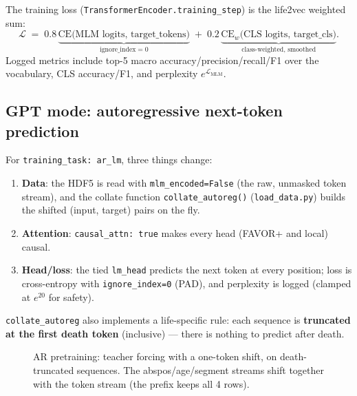 \documentclass[11pt,a4paper]{article}
\newcommand{\file}[1]{\texttt{\small #1}}
\newcommand{\code}[1]{\texttt{\small #1}}
\begin{document}
\noindent The training loss (\code{TransformerEncoder.training\_step}) is the
life2vec weighted sum:
\[
\mathcal{L} \;=\; 0.8\,\underbrace{\mathrm{CE}\big(\text{MLM logits},\,
\text{target\_tokens}\big)}_{\text{ignore\_index}=0}
\;+\; 0.2\,\underbrace{\mathrm{CE}_{w}\big(\text{CLS logits},\,
\text{target\_cls}\big)}_{\text{class-weighted, smoothed}}.
\]
Logged metrics include top-5 macro accuracy/precision/recall/F1 over the
vocabulary, CLS accuracy/F1, and perplexity $e^{\mathcal{L}_{\mathrm{MLM}}}$.

\subsection{GPT mode: autoregressive next-token prediction}
For \code{training\_task: ar\_lm}, three things change:
\begin{enumerate}[nosep]
  \item \textbf{Data}: the HDF5 is read with \code{mlm\_encoded=False} (the raw,
        unmasked token stream), and the collate function
        \code{collate\_autoreg()} (\file{load\_data.py}) builds the shifted
        (input, target) pairs on the fly.
  \item \textbf{Attention}: \code{causal\_attn: true} makes every head (FAVOR+
        and local) causal.
  \item \textbf{Head/loss}: the tied \code{lm\_head} predicts the next token at
        every position; loss is cross-entropy with \code{ignore\_index=0}
        (PAD), and perplexity is logged (clamped at $e^{20}$ for safety).
\end{enumerate}
\code{collate\_autoreg} also implements a life-specific rule: each sequence is
\textbf{truncated at the first death token} (inclusive) --- there is nothing to
predict after death.

\begin{figure}[h!]
\centering
{}
\caption{AR pretraining: teacher forcing with a one-token shift, on
death-truncated sequences. The abspos/age/segment streams shift together with
the token stream (the prefix keeps all 4 rows).}
\label{fig:ar}
\end{figure}
\end{document}
